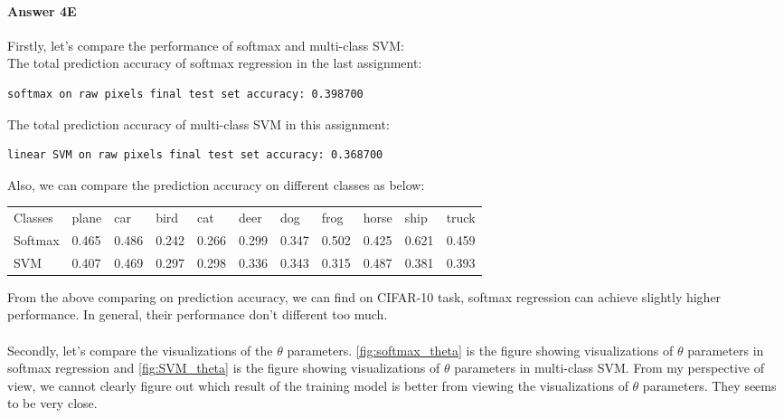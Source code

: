 \documentclass[paper=a4, fontsize=11pt]{scrartcl} %
\numberwithin{equation}{section} %
\numberwithin{figure}{section} %
\numberwithin{table}{section} %
\begin{document}
\paragraph{\textbf{Answer 4E}}
Firstly, let's compare the performance of softmax and multi-class SVM:
\\ The total prediction accuracy of softmax regression in the last assignment:
\begin{verbatim}
softmax on raw pixels final test set accuracy: 0.398700
\end{verbatim}
The total prediction accuracy of multi-class SVM in this assignment:
\begin{verbatim}
linear SVM on raw pixels final test set accuracy: 0.368700
\end{verbatim}
Also, we can compare the prediction accuracy on different classes as below:
\begin{table}[H]
	\centering
	\label{comparing_table}
	\begin{tabular}{lllllllllll}
	Classes            & plane & car   & bird  & cat   & deer  & dog   & frog  & horse & ship  & truck \\
	Softmax & 0.465 & 0.486 & 0.242 & 0.266 & 0.299 & 0.347 & 0.502 & 0.425 & 0.621 & 0.459 \\
	SVM                & 0.407 & 0.469 & 0.297 & 0.298 & 0.336 & 0.343 & 0.315 & 0.487 & 0.381 & 0.393 
	\end{tabular}
\end{table}
From the above comparing on prediction accuracy, we can find on CIFAR-10 task, softmax regression can achieve slightly higher performance. In general, their performance don't different too much.
\\
\\ Secondly, let's compare the visualizations of the $\theta$ parameters. \ref{fig:softmax_theta} is the figure showing visualizations of $\theta$ parameters in softmax regression and \ref{fig:SVM_theta} is the figure showing visualizations of $\theta$ parameters in multi-class SVM. From my perspective of view, we cannot clearly figure out which result of the training model is better from viewing the visualizations of $\theta$ parameters. They seems to be very close.
\end{document}
